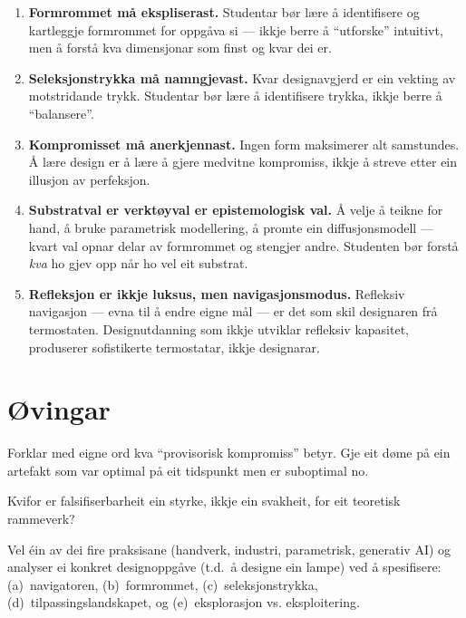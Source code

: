 \begin{enumerate}
  \item \textbf{Formrommet må ekspliserast.}
    Studentar bør lære å identifisere og kartleggje formrommet for
    oppgåva si --- ikkje berre å ``utforske'' intuitivt, men å
    forstå kva dimensjonar som finst og kvar dei er.

  \item \textbf{Seleksjonstrykka må namngjevast.}
    Kvar designavgjerd er ein vekting av motstridande trykk.
    Studentar bør lære å identifisere trykka, ikkje berre å
    ``balansere''.

  \item \textbf{Kompromisset må anerkjennast.}
    Ingen form maksimerer alt samstundes. Å lære design er å lære
    å gjere medvitne kompromiss, ikkje å streve etter ein illusjon
    av perfeksjon.

  \item \textbf{Substratval er verktøyval er epistemologisk val.}
    Å velje å teikne for hand, å bruke parametrisk modellering, å
    promte ein diffusjonsmodell --- kvart val opnar delar av
    formrommet og stengjer andre. Studenten bør forstå \emph{kva}
    ho gjev opp når ho vel eit substrat.

  \item \textbf{Refleksjon er ikkje luksus, men navigasjonsmodus.}
    Refleksiv navigasjon --- evna til å endre eigne mål --- er det
    som skil designaren frå termostaten. Designutdanning som ikkje
    utviklar refleksiv kapasitet, produserer sofistikerte
    termostatar, ikkje designarar.
\end{enumerate}


\section{Øvingar}

\begin{exercise}[Nivå 1]\label{ex:9.1}
Forklar med eigne ord kva ``provisorisk kompromiss'' betyr. Gje eit
døme på ein artefakt som var optimal på eit tidspunkt men er
suboptimal no.
\end{exercise}

\begin{exercise}[Nivå 1]\label{ex:9.2}
Kvifor er falsifiserbarheit ein styrke, ikkje ein svakheit, for eit
teoretisk rammeverk?
\end{exercise}

\begin{exercise}[Nivå 2]\label{ex:9.3}
Vel éin av dei fire praksisane (handverk, industri, parametrisk,
generativ AI) og analyser ei konkret designoppgåve (t.d.\ å
designe ein lampe) ved å spesifisere: (a)~navigatoren, (b)~formrommet,
(c)~seleksjonstrykka, (d)~tilpassingslandskapet, og
(e)~eksplorasjon vs. eksploitering.
\end{exercise}

